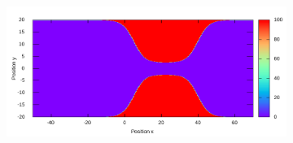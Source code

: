 \documentclass[11pt, a4paper]{article} %
\begin{document}
\begin{figure}[h!]
  \centering
    \begin{subfigure}[b]{0.62\linewidth}
    \includegraphics[width=\linewidth]{pot.png}
  \end{subfigure}
  \begin{subfigure}[b]{0.15\linewidth}

\end{subfigure}
\end{figure}
\end{document}
